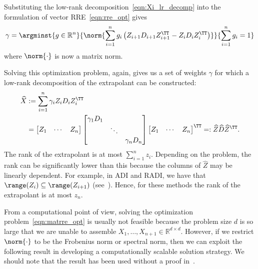 Substituting the low-rank decomposition~\eqref{eqn:Xi_lr_decomp} into the formulation of vector \ac{RRE}~\eqref{eqn:rre_opt} gives
\begin{equation}
	\gamma = \argminst{%
		g\in\mathbb R^n
	}{%
		\norm{ \sum_{i=1}^{n} g_i \left( Z_{i+1} D_{i+1} Z_{i+1}^\TT - Z_i D_i Z_i^\TT \right) }
	}{%
		\sum_{i=1}^{n} g_i = 1
	}
	\label{eqn:matrre_opt}
\end{equation}
where $\norm{ \cdot }$ is now a matrix norm.

Solving this optimization problem, again, gives us a set of weights $\gamma$ for which a low-rank decomposition of the extrapolant can be constructed:
\begin{equation}
\begin{aligned}
	\widehat{X} & := \sum_{i=1}^{n} \gamma_i Z_i D_i Z_i^\TT \\
	& = \begin{bmatrix} Z_1 & \cdots & Z_n \end{bmatrix}
	\begin{bmatrix} \gamma_1 D_1 \\ & \ddots \\ & & \gamma_n D_n \end{bmatrix}
	\begin{bmatrix} Z_1 & \cdots & Z_n \end{bmatrix}^\TT
	=: \widehat{Z} \widehat{D} \widehat{Z}^\TT.
\end{aligned}
\label{eqn:matrre_extrapolant}
\end{equation}
The rank of the extrapolant is at most $\sum_{i=1}^{n} z_i$.
Depending on the problem, the rank can be significantly lower than this because the columns of $\widehat{Z}$ may be linearly dependent.
For example, in \ac{ADI} and RADI, we have that $\range(Z_i) \subseteq \range(Z_{i+1})$ (see~\cite[eq.~(12)]{benner2018radi}).
Hence, for these methods the rank of the extrapolant is at most $z_n$.

From a computational point of view, solving the optimization problem~\eqref{eqn:matrre_opt} is usually not feasible because the problem size $d$ is so large that we are unable to assemble $X_1, \ldots, X_{n+1} \in\mathbb R^{d \times d}$.
However, if we restrict $\norm{\cdot}$ to be the Frobenius norm or spectral norm, then we can exploit the following result in developing a computationally scalable solution strategy.
We should note that the result has been used without a proof in~\cite[equation~(4.7)]{penzl1999cyclic}.

